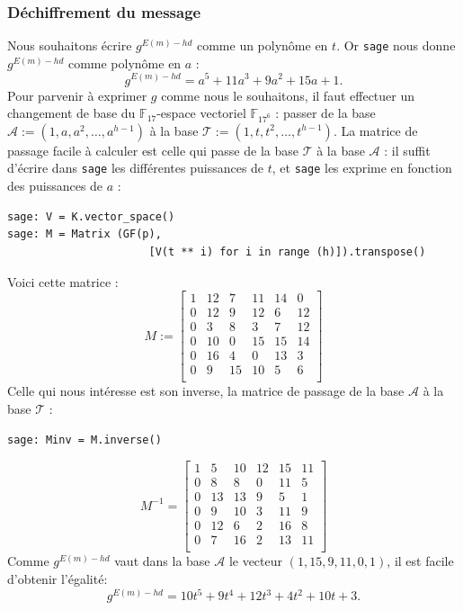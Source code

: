 \documentclass[a4paper, titlepage, 11pt]{article}
\theoremstyle{definition}
\theoremstyle{remark}
\def\gf #1{\mathbb{F}_{#1}}
\begin{document}
\subsubsection{Déchiffrement du message}
Nous souhaitons écrire $g^{E(m) - hd}$ comme un polynôme en $t$. Or \verb|sage| nous donne $g^{E(m) - hd}$ comme polynôme en $a$ : $$g^{E(m) - hd} = a^5 + 11a^3 + 9a^2 + 15a + 1.$$
Pour parvenir à exprimer $g$ comme nous le souhaitons, il faut effectuer un changement de base du $\gf{17}$-espace vectoriel $\gf{17^6}$ : passer de la base $\mathcal{A} := (1, a, a^2, \dots, a^{h-1})$ à la base $\mathcal{T} := (1, t, t^2, \dots, t^{h-1})$.
La matrice de passage facile à calculer est celle qui passe de la base $\mathcal{T}$ à la base $\mathcal{A}$ : il suffit d'écrire dans \verb|sage| les différentes puissances de $t$, et \verb|sage| les exprime en fonction des puissances de $a$ :
\begin{verbatim}
sage: V = K.vector_space()
sage: M = Matrix (GF(p),
                      [V(t ** i) for i in range (h)]).transpose()
\end{verbatim}
Voici cette matrice :
$$M := \left[\begin{array}{cccccc}
1 & 12 & 7 & 11 & 14 & 0 \\
0 & 12 & 9 & 12 & 6 & 12 \\
0 & 3 & 8 & 3 & 7 & 12 \\
0 & 10 & 0 & 15 & 15 & 14 \\
0 & 16 & 4 & 0 & 13 & 3 \\
0 & 9 & 15 & 10 & 5 & 6 \\
\end{array}\right]$$
Celle qui nous intéresse est son inverse, la matrice de passage de la base $\mathcal{A}$ à la base $\mathcal{T}$ :
\begin{verbatim}
sage: Minv = M.inverse()
\end{verbatim}
$$M^{-1} = \left[\begin{array}{cccccc}
1 & 5 & 10 & 12 & 15 & 11 \\
0 & 8 & 8 & 0 & 11 & 5 \\
0 & 13 & 13 & 9 & 5 & 1 \\
0 & 9 & 10 & 3 & 11 & 9 \\
0 & 12 & 6 & 2 & 16 & 8 \\
0 & 7 & 16 & 2 & 13 & 11 \\
\end{array}\right]$$
Comme $g^{E(m) - hd}$ vaut dans la base $\mathcal{A}$ le vecteur $(1, 15, 9, 11, 0, 1)$, il est facile d'obtenir l'égalité:
$$g^{E(m) - hd} = 10t^5 + 9t^4 + 12t^3 + 4t^2 + 10t + 3.$$
\end{document}
